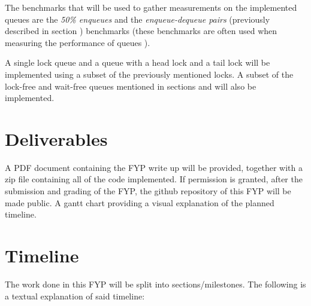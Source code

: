 \documentclass[a4paper, 12pt, titlepage]{article}
\begin{document}
\begin{onehalfspacing}
The benchmarks that will be used to gather measurements on the implemented queues are the \emph{50\% enqueues} and the \emph{enqueue-dequeue pairs} (previously described in section ) benchmarks (these benchmarks are often used when measuring the performance of queues \cite{kogan2011wait,hoffman2007baskets,ladan2004optimistic}).

A single lock queue and a queue with a head lock and a tail lock will be implemented using a subset of the previously mentioned locks. A subset of the lock-free and wait-free queues mentioned in sections  and  will also be implemented.

\section{Deliverables}
A PDF document containing the FYP write up will be provided, together with a zip file containing all of the code implemented. If permission is granted, after the submission and grading of the FYP, the github repository of this FYP will be made public. A gantt chart providing a visual explanation of the planned timeline.

\section{Timeline}
The work done in this FYP will be split into sections/milestones. The following is a textual explanation of said timeline:


\end{onehalfspacing}
\end{document}
